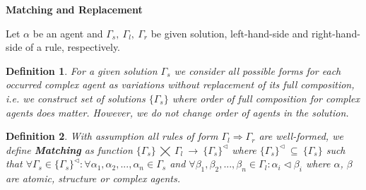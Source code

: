 \documentclass[12pt]{article}
\newtheorem{mydef}{Definition}
\newcommand{\mysection}[1]{{\newpage\centering\Large\textbf{#1}\\}\normalsize\vspace{0.5cm}}
\begin{document}
\mysection{Matching and Replacement}

Let $\alpha$ be an agent and $\Gamma_s,~\Gamma_l,~\Gamma_r$ be given solution, left-hand-side and right-hand-side of a rule, respectively.

\begin{mydef}
For a given solution $\Gamma_s$ we consider all possible forms for each occurred complex agent as variations without replacement of its full composition, i.e. we construct set of solutions $\{\Gamma_s\}$ where order of full composition for complex agents does matter. However, we do not change order of agents in the solution.
\end{mydef}

\begin{mydef}
With assumption all rules of form $\Gamma_l\Rightarrow\Gamma_r$ are well-formed, we define \textbf{Matching} as function $\{\Gamma_s\}~\bigtimes~\Gamma_l~\rightarrow~\{\Gamma_s\}^{\lhd}$ where $\{\Gamma_s\}^{\lhd}~\subseteq~\{\Gamma_s\}$ such that $\forall \Gamma_s \in \{\Gamma_s\}^{\lhd} : \forall \alpha_1, \alpha_2, ..., \alpha_n \in \Gamma_s $ and $\forall \beta_1, \beta_2, ..., \beta_n \in \Gamma_l : \alpha_i \lhd \beta_i$ where $\alpha$, $\beta$ are atomic, structure or complex agents.
\end{mydef}
\end{document}
